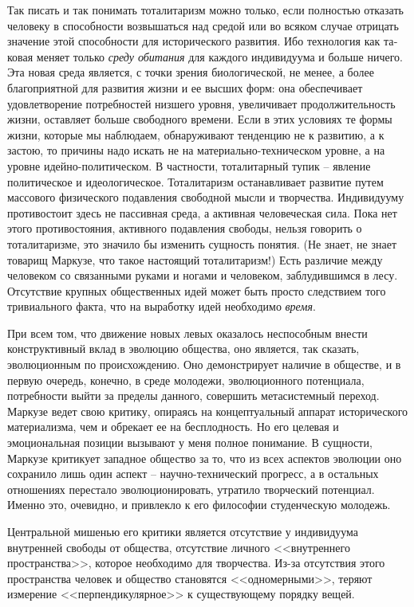 \documentclass{book}
\begin{document}
Так писать и так понимать тоталитаризм можно только, ес­ли полностью отказать человеку в способности возвышаться над средой или во всяком случае отрицать значение этой спо­собности для исторического развития. Ибо технология как та­ковая меняет только \textit{среду обитания}  для каждого индивиду­ума и больше ничего. Эта новая среда является, с точки зрения биологической, не менее, а более благоприятной для развития жизни и ее высших форм: она обеспечивает удовлетворение потребностей низшего уровня, увеличивает продолжительность жизни, оставляет больше свободного времени. Если в этих ус­ловиях те формы жизни, которые мы наблюдаем, обнаружи­вают тенденцию не к развитию, а к застою, то причины надо ис­кать не на материально-техническом уровне, а на уровне идей­но-политическом. В частности, тоталитарный тупик -- явление политическое и идеологическое. Тоталитаризм останавливает развитие путем массового физического подавления свободной мысли и творчества. Индивидууму противостоит здесь не пассив­ная среда, а 
активная 
человеческая сила. Пока нет этого проти­востояния, активного подавления свободы, нельзя говорить о тоталитаризме, это значило бы изменить сущность понятия. (Не знает, не знает товарищ Маркузе, что такое настоящий то­талитаризм!) Есть различие между человеком со связанными руками и ногами и человеком, заблудившимся в лесу. Отсутст­вие крупных общественных идей может быть просто следстви­ем того тривиального факта, что на выработку идей необхо­димо \textit{время}. 

При всем том, что движение новых левых оказалось неспо­собным внести конструктивный вклад в эволюцию общества, оно является, так сказать, эволюционным по происхождению. Оно демонстрирует наличие в обществе, и в первую очередь, конечно, в среде молодежи, эволюционного потенциала, потребности выйти за пределы данного, совершить метасистемный переход. Маркузе ведет свою критику, опираясь на кон­цептуальный аппарат исторического материализма, чем и обре­кает ее на бесплодность. Но его целевая и эмоциональная пози­ции вызывают у меня полное понимание. В сущности, Маркузе критикует западное общество за то, что из всех аспектов эво­люции оно сохранило лишь один аспект -- научно-технический прогресс, а в остальных отношениях перестало эволюциони­ровать, утратило творческий потенциал. Именно это, очевид­но, и привлекло к его философии студенческую молодежь.

Центральной мишенью его критики является отсутствие у индивидуума внутренней свободы от общества, отсутствие лич­ного <<внутреннего пространства>>, которое необходимо для творчества. Из-за отсутствия этого пространства человек и об­щество становятся <<одномерными>>, теряют измерение <<пер­пендикулярное>> к существующему порядку вещей.
\end{document}
